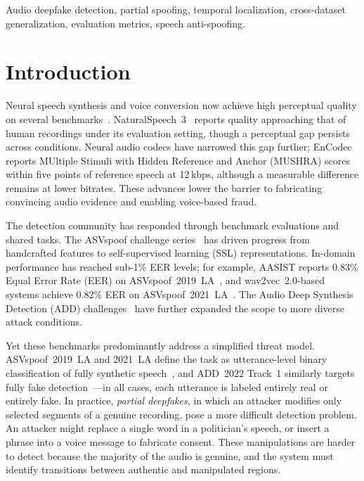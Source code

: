 \documentclass[journal]{IEEEtran}
\begin{document}
\begin{IEEEkeywords}
Audio deepfake detection, partial spoofing, temporal localization, cross-dataset generalization, evaluation metrics, speech anti-spoofing.
\end{IEEEkeywords}

\section{Introduction}
\label{sec:intro}

Neural speech synthesis and voice conversion now achieve high perceptual quality on several benchmarks~\cite{tan2021ttssurvey}. NaturalSpeech~3~\cite{ju2024naturalspeech3} reports quality approaching that of human recordings under its evaluation setting, though a perceptual gap persists across conditions. Neural audio codecs have narrowed this gap further; EnCodec~\cite{defossez2023encodec} reports MUltiple Stimuli with Hidden Reference and Anchor (MUSHRA) scores within five points of reference speech at 12\,kbps, although a measurable difference remains at lower bitrates. These advances lower the barrier to fabricating convincing audio evidence and enabling voice-based fraud.

The detection community has responded through benchmark evaluations and shared tasks. The ASVspoof challenge series~\cite{wang2020asvspoof2019,yamagishi2021asvspoof2021,wang2024asvspoof5} has driven progress from handcrafted features to self-supervised learning (SSL) representations. In-domain performance has reached sub-1\% EER levels; for example, AASIST reports 0.83\% Equal Error Rate (EER) on ASVspoof~2019~LA~\cite{jung2022aasist}, and wav2vec~2.0-based systems achieve 0.82\% EER on ASVspoof~2021~LA~\cite{tak2022ssl}. The Audio Deep Synthesis Detection (ADD) challenges~\cite{yi2022add,yi2023add} have further expanded the scope to more diverse attack conditions.

Yet these benchmarks predominantly address a simplified threat model. ASVspoof~2019~LA and 2021~LA define the task as utterance-level binary classification of fully synthetic speech~\cite{wang2020asvspoof2019,yamagishi2021asvspoof2021}, and ADD~2022 Track~1 similarly targets fully fake detection~\cite{yi2022add}---in all cases, each utterance is labeled entirely real or entirely fake. In practice, \emph{partial deepfakes}, in which an attacker modifies only selected segments of a genuine recording, pose a more difficult detection problem. An attacker might replace a single word in a politician's speech, or insert a phrase into a voice message to fabricate consent. These manipulations are harder to detect because the majority of the audio is genuine, and the system must identify transitions between authentic and manipulated regions.
\end{document}

